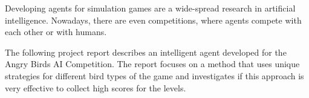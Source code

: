 Developing agents for simulation games are a wide-spread research in artificial intelligence. Nowadays, there are even competitions, where agents compete with each other or with humans. 

The following project report describes an intelligent agent developed for the Angry Birds AI Competition. The report focuses on a method that uses unique strategies for different bird types of the game and investigates if this approach is very effective to collect high scores for the levels.
